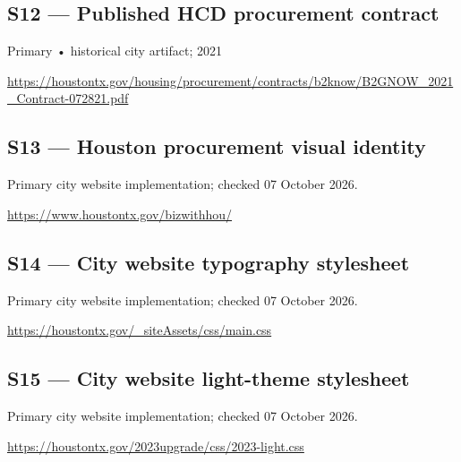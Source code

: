 \documentclass[11pt,letterpaper]{article}
\begin{document}
\subsection*{S12 — Published HCD procurement contract}\label{src:S12}
Primary • historical city artifact; 2021\par
\url{https://houstontx.gov/housing/procurement/contracts/b2know/B2GNOW_2021_Contract-072821.pdf}

\subsection*{S13 --- Houston procurement visual identity}\label{src:S13}
Primary city website implementation; checked 07 October 2026.\par
\url{https://www.houstontx.gov/bizwithhou/}

\subsection*{S14 --- City website typography stylesheet}\label{src:S14}
Primary city website implementation; checked 07 October 2026.\par
\url{https://houstontx.gov/_siteAssets/css/main.css}

\subsection*{S15 --- City website light-theme stylesheet}\label{src:S15}
Primary city website implementation; checked 07 October 2026.\par
\url{https://houstontx.gov/2023upgrade/css/2023-light.css}
\end{document}
